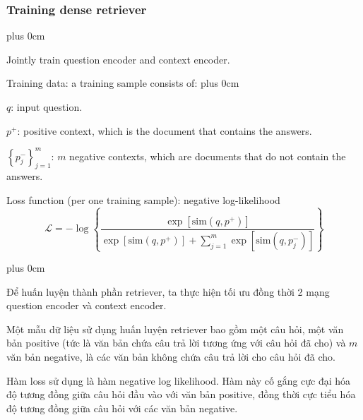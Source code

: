 \documentclass[11pt]{beamer}
\renewcommand{\raggedright}{\leftskip=0pt \rightskip=0pt plus 0cm}
\let\olditemize=\itemize
\renewenvironment{itemize}{\olditemize\raggedright}{\endlist}
\begin{document}
\begin{frame}
	\frametitle{Training dense retriever}
	\begin{itemize}
		\item Jointly train question encoder and context encoder.
		\item Training data: a training sample consists of:
		\begin{itemize}
			\item $q$: input question.
			\item $p^+$: positive context, which is the document that contains the answers.\\[5pt]
			\item $\left\{p^-_j\right\}_{j=1}^m$: $m$ negative contexts, which are documents that do not contain the answers.
		\end{itemize}
		\item Loss function (per one training sample): negative log-likelihood
		\begin{equation}
			\label{eq:01}
			\mathcal{L} = -\log\left\{\dfrac{\exp\left[{\text{sim}\left(q, p^+\right)}\right]}{\exp\left[{\text{sim}\left(q, p^+\right)}\right] + \sum\limits_{j=1}^m \exp\left[{\text{sim}\left(q, p^-_j\right)}\right]}\right\}
		\end{equation}
	\end{itemize}
\end{frame}
\begin{frame}
	\begin{itemize}
		\item Để huấn luyện thành phần retriever, ta thực hiện tối ưu đồng thời 2 mạng question encoder và context encoder.
		\item Một mẫu dữ liệu sử dụng huấn luyện retriever bao gồm một câu hỏi, một văn bản positive (tức là văn bản chứa câu trả lời tương ứng với câu hỏi đã cho) và $m$ văn bản negative, là các văn bản không chứa câu trả lời cho câu hỏi đã cho.
		\item Hàm loss sử dụng là hàm negative log likelihood. Hàm này cố gắng cực đại hóa độ tương đồng giữa câu hỏi đầu vào với văn bản positive, đồng thời cực tiểu hóa độ tương đồng giữa câu hỏi với các văn bản negative.
	\end{itemize}
\end{frame}
\end{document}
